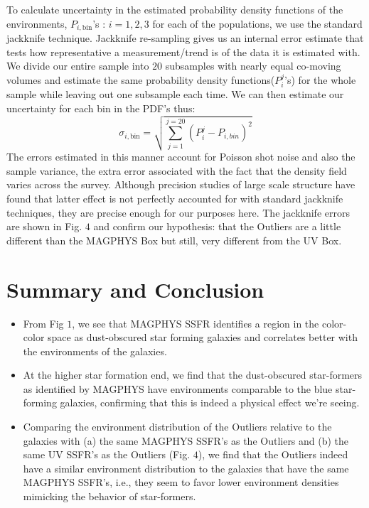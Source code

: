\documentclass[iop]{emulateapj}
\begin{document}
To calculate uncertainty in the estimated probability density 
functions of the environments, $P_{i,\mathrm{bin}}$'s : 
$i = 1,2,3$ for each of the populations, we use the standard 
jackknife technique. Jackknife re-sampling gives us an internal 
error estimate that tests how representative a measurement/trend 
is of the data it is estimated with. We divide our entire 
sample into $20$ subsamples with nearly equal co-moving 
volumes and estimate the same probability density 
functions($P^{j}_{i}$'s) for the whole sample while leaving 
out one subsample each time. We can then estimate our uncertainty 
for each bin in the PDF's thus:
$$ \sigma_{i, \mathrm{bin}} = \sqrt{\sum_{j = 1}^{j = 20} (P^{j}_{i} - P_{i,bin})^{2}} $$
The errors estimated in this manner account for Poisson shot
noise and also the sample variance, the extra error associated
with the fact that the density field varies across the survey. 
Although precision studies of large scale structure have found
that latter effect is not perfectly accounted for with standard
jackknife techniques, they are precise enough for our purposes
here. The jackknife errors are shown in Fig. $4$ and confirm our 
hypothesis: that the Outliers are a little different than the 
MAGPHYS Box but still, very different from the UV Box.

\section{Summary and Conclusion}


\begin{itemize}
\item{From Fig $1$, we see that MAGPHYS SSFR identifies a region in the color-color space as dust-obscured star forming galaxies and correlates better with the environments of the galaxies.}
\item{At the higher star formation end, we find that the dust-obscured star-formers as identified by MAGPHYS have environments comparable to the blue star-forming galaxies, confirming that this is indeed a physical effect we're seeing.}
\item{Comparing the environment distribution of the Outliers relative to the galaxies with (a) the same MAGPHYS SSFR's as the Outliers and (b) the same UV SSFR's as the Outliers (Fig. $4$), we find that the Outliers indeed have a similar environment distribution to the galaxies that have the same MAGPHYS SSFR's, i.e., they seem to favor lower environment densities mimicking the behavior of star-formers.}
\end{itemize}
\end{document}

